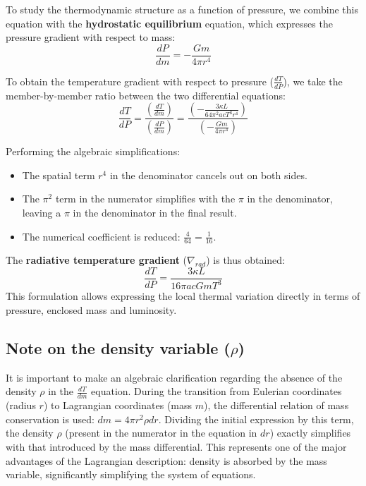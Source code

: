 To study the thermodynamic structure as a function of pressure, we combine this equation with the \textbf{hydrostatic equilibrium} equation, which expresses the pressure gradient with respect to mass:
\begin{equation}
\frac{dP}{dm} = - \frac{G m}{4 \pi r^4}
\end{equation}

To obtain the temperature gradient with respect to pressure ($\frac{dT}{dP}$), we take the member-by-member ratio between the two differential equations:
\begin{equation}
\frac{dT}{dP} = \frac{\left( \frac{dT}{dm} \right)}{\left( \frac{dP}{dm} \right)} = \frac{\left( - \frac{3 \kappa L}{64 \pi^2 a c T^3 r^4} \right)}{\left( - \frac{G m}{4 \pi r^4} \right)}
\end{equation}

Performing the algebraic simplifications:
\begin{itemize}
\item The spatial term $r^4$ in the denominator cancels out on both sides.
\item The $\pi^2$ term in the numerator simplifies with the $\pi$ in the denominator, leaving a $\pi$ in the denominator in the final result.
\item The numerical coefficient is reduced: $\frac{4}{64} = \frac{1}{16}$.
\end{itemize}

The \textbf{radiative temperature gradient} ($\nabla_{rad}$) is thus obtained:
\begin{equation}
\frac{dT}{dP} = \frac{3 \kappa L}{16 \pi a c G m T^3}
\end{equation}
This formulation allows expressing the local thermal variation directly in terms of pressure, enclosed mass and luminosity.

\subsection{Note on the density variable ($\rho$)}
It is important to make an algebraic clarification regarding the absence of the density $\rho$ in the $\frac{dT}{dm}$ equation. During the transition from Eulerian coordinates (radius $r$) to Lagrangian coordinates (mass $m$), the differential relation of mass conservation is used: $dm = 4\pi r^2 \rho dr$. Dividing the initial expression by this term, the density $\rho$ (present in the numerator in the equation in $dr$) exactly simplifies with that introduced by the mass differential. This represents one of the major advantages of the Lagrangian description: density is absorbed by the mass variable, significantly simplifying the system of equations.

